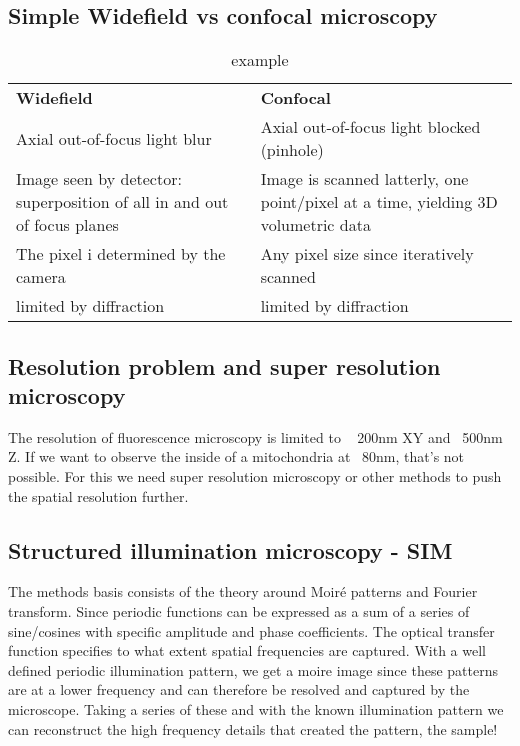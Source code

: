 	\subsection*{Simple Widefield vs confocal microscopy}
	
	\begin{table}[ht!]
	\centering
	\begin{tabularx}{\textwidth}{XX}\hline
	 \textbf{Widefield}&  \textbf{Confocal}  \\
	 Axial out-of-focus light blur&   Axial out-of-focus light blocked (pinhole) \\
	 Image seen by detector: superposition of all in and out of focus planes& Image is scanned latterly, one point/pixel at a time, yielding 3D volumetric data   \\

	 The pixel i determined by the camera & Any pixel size since iteratively scanned  \\ 
	 limited by diffraction& limited by diffraction\\ \hline
	\end{tabularx}
	\caption{example}
	\label{tab:tab1}
	\end{table}
	
	\subsection*{Resolution problem and super resolution microscopy}
	The resolution of fluorescence microscopy is limited to ~ 200nm XY and ~500nm Z. If we want to observe the inside of a mitochondria at ~80nm, that's not possible. For this we need super resolution microscopy or other methods to push the spatial resolution further. 

	\subsection*{Structured illumination microscopy - SIM}
	The methods basis consists of the theory around Moiré patterns and Fourier transform. Since periodic functions can be expressed as a sum of a series of sine/cosines with specific amplitude and phase coefficients. The optical transfer function specifies to what extent spatial frequencies are captured. 
	With a well defined periodic illumination pattern, we get a moire image since these patterns are at a lower frequency and can therefore be resolved and captured by the microscope. Taking a series of these and with the known illumination pattern we can reconstruct the high frequency details that created the pattern, the sample!

